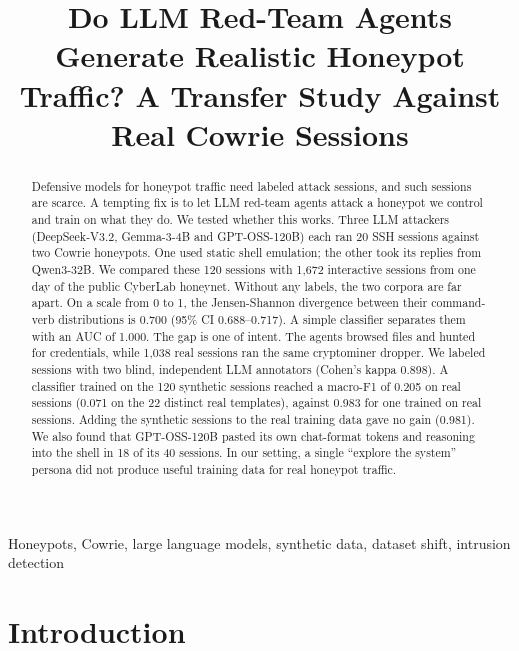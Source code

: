 \documentclass[conference]{IEEEtran}
\begin{document}
\title{Do LLM Red-Team Agents Generate Realistic Honeypot Traffic? A Transfer Study Against Real Cowrie Sessions}

\author{
}

\maketitle

\begin{abstract}
Defensive models for honeypot traffic need labeled attack sessions, and such sessions are scarce. A tempting fix is to let LLM red-team agents attack a honeypot we control and train on what they do. We tested whether this works. Three LLM attackers (DeepSeek-V3.2, Gemma-3-4B and GPT-OSS-120B) each ran 20 SSH sessions against two Cowrie honeypots. One used static shell emulation; the other took its replies from Qwen3-32B. We compared these 120 sessions with 1,672 interactive sessions from one day of the public CyberLab honeynet. Without any labels, the two corpora are far apart. On a scale from 0 to 1, the Jensen-Shannon divergence between their command-verb distributions is 0.700 (95\% CI 0.688--0.717). A simple classifier separates them with an AUC of 1.000. The gap is one of intent. The agents browsed files and hunted for credentials, while 1,038 real sessions ran the same cryptominer dropper. We labeled sessions with two blind, independent LLM annotators (Cohen's kappa 0.898). A classifier trained on the 120 synthetic sessions reached a macro-F1 of 0.205 on real sessions (0.071 on the 22 distinct real templates), against 0.983 for one trained on real sessions. Adding the synthetic sessions to the real training data gave no gain (0.981). We also found that GPT-OSS-120B pasted its own chat-format tokens and reasoning into the shell in 18 of its 40 sessions. In our setting, a single ``explore the system'' persona did not produce useful training data for real honeypot traffic.
\end{abstract}

\begin{IEEEkeywords}
Honeypots, Cowrie, large language models, synthetic data, dataset shift, intrusion detection
\end{IEEEkeywords}

\section{Introduction}
\end{document}
